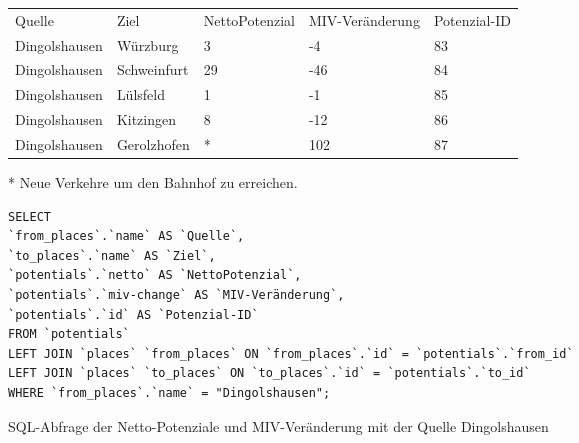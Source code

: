 \begin{tabularx}{\textwidth}{*5{X}}
Quelle & Ziel & NettoPotenzial & MIV-Veränderung & Potenzial-ID\\ 
Dingolshausen & Würzburg & 3 & -4 & 83\\ 
Dingolshausen & Schweinfurt & 29 & -46 & 84\\ 
Dingolshausen & Lülsfeld & 1 & -1 & 85\\ 
Dingolshausen & Kitzingen & 8 & -12 & 86\\ 
Dingolshausen & Gerolzhofen & * & 102 & 87\\ 
\end{tabularx}
\newline
\newline
* Neue Verkehre um den Bahnhof zu erreichen.
\newline
\begin{listing}[htbp]
\begin{verbatim}
SELECT
`from_places`.`name` AS `Quelle`, 
`to_places`.`name` AS `Ziel`, 
`potentials`.`netto` AS `NettoPotenzial`, 
`potentials`.`miv-change` AS `MIV-Veränderung`, 
`potentials`.`id` AS `Potenzial-ID`
FROM `potentials`
LEFT JOIN `places` `from_places` ON `from_places`.`id` = `potentials`.`from_id`
LEFT JOIN `places` `to_places` ON `to_places`.`id` = `potentials`.`to_id`
WHERE `from_places`.`name` = "Dingolshausen";
\end{verbatim}
\caption{SQL-Abfrage der Netto-Potenziale und MIV-Veränderung mit der Quelle Dingolshausen}\label{lst-fz-dingolhausen}
\end{listing}